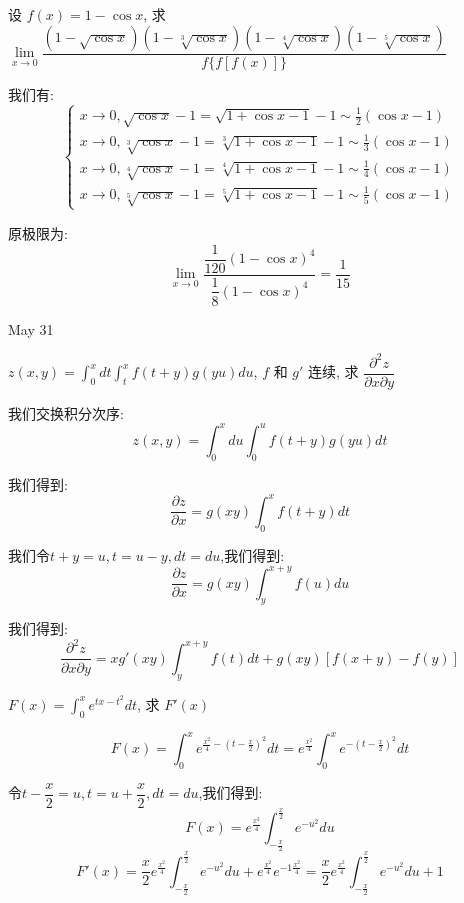 \begin{example}[][Exam: 31.4.18]
	设 $f(x)=1-\cos x$, 求 $\lim\limits_{x\to 0}\dfrac{(1-\sqrt{\cos x})(1-\sqrt[3]{\cos x})(1-\sqrt[4]{\cos x})(1-\sqrt[5]{\cos x})}{f\{f[f(x)]\}}$
\end{example}

\begin{solution}
	
	我们有: 
	$$\left\lbrace 
	\begin{array}{l}
		x\to 0,\sqrt{\cos x}-1=\sqrt{1+\cos x-1}-1\sim \frac{1}{2}(\cos x-1) \\
		x\to 0,\sqrt[3]{\cos x}-1=\sqrt[3]{1+\cos x-1}-1\sim \frac{1}{3}(\cos x-1)\\
		x\to 0,\sqrt[4]{\cos x}-1=\sqrt[4]{1+\cos x-1}-1\sim \frac{1}{4}(\cos x-1)\\
		x\to 0,\sqrt[5]{\cos x}-1=\sqrt[5]{1+\cos x-1}-1\sim \frac{1}{5}(\cos x-1)
	\end{array}
	\right. $$
	
	原极限为: 
	$$\lim\limits_{x\to 0}\dfrac{\dfrac{1}{120}(1-\cos x)^4}{\dfrac{1}{8}(1-\cos x)^4}=\frac{1}{15}$$
\end{solution}


\textcolor{purplea}{May 31}

\begin{example}[][Exam: 31.4.19]
	$z(x,y) = \int_{0}^{x}dt\int_{t}^{x}f(t+y)g(yu)du$, $f$ 和 $g'$ 连续, 求 $\dfrac{\partial^2 z}{\partial x\partial y}$
\end{example}

\begin{solution}
	
	我们交换积分次序: 
	$$z(x,y)=\int_{0}^{x}du\int_{0}^{u}f(t+y)g(yu)dt$$
	
	我们得到: 
	$$\dfrac{\partial z}{\partial x}=g(xy)\int_{0}^{x}f(t+y)dt$$
	
	我们令$t+y=u,t=u-y,dt=du$,我们得到: 
	$$\dfrac{\partial z}{\partial x}=g(xy)\int_{y}^{x+y}f(u)du$$
	
	我们得到: 
	$$\dfrac{\partial^2 z}{\partial x\partial y}=xg'(xy)\int_{y}^{x+y}f(t)dt+g(xy)[f(x+y)-f(y)]$$
\end{solution}

\begin{example}[][Exam: 31.4.20]
	$F(x) = \int_{0}^{x}e^{tx-t^2}dt$, 求 $F'(x)$
\end{example}

\begin{solution}
	$$F(x)=\int_{0}^{x}e^{\frac{x^2}{4}-(t-\frac{x}{2})^2}dt=e^{\frac{x^2}{4}}\int_{0}^{x}e^{-(t-\frac{x}{2})^2}dt$$
	
	令$t-\dfrac{x}{2}=u,t=u+\dfrac{x}{2},dt=du$,我们得到: 
	$$F(x)=e^{\frac{x^2}{4}}\int_{-\frac{x}{2}}^{\frac{x}{2}}e^{-u^2}du$$
	$$F'(x)=\frac{x}{2}e^{\frac{x^2}{4}}\int_{-\frac{x}{2}}^{\frac{x}{2}}e^{-u^2}du+e^{\frac{x^2}{4}}e^{-1\frac{x^2}{4}}=\frac{x}{2}e^{\frac{x^2}{4}}\int_{-\frac{x}{2}}^{\frac{x}{2}}e^{-u^2}du+1$$
\end{solution}